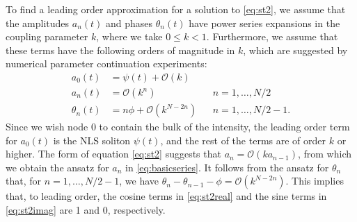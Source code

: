\documentclass[11pt,reqno]{amsart}
\begin{document}
To find a leading order approximation for a solution to \cref{eq:st2}, we assume that the amplitudes $a_n(t)$ and phases $\theta_n(t)$ have power series expansions in the coupling parameter $k$, where we take $0 \leq k < 1$. Furthermore, we assume that these terms have the following orders of magnitude in $k$, which are suggested by numerical parameter continuation experiments:
\begin{equation}\label{eq:basicseries}
\begin{aligned}
a_0(t) &= \psi(t) + \mathcal{O}\left(k\right) \\
a_n(t) &= \mathcal{O}\left(k^n\right) && n = 1, \dots, N/2 \\
\theta_n(t) &= n \phi + \mathcal{O}\left(k^{N - 2n}\right) && n = 1, \dots, N/2-1.
\end{aligned}
\end{equation}
Since we wish node 0 to contain the bulk of the intensity, the leading order term for $a_0(t)$ is the NLS soliton $\psi(t)$, and the rest of the terms are of order $k$ or higher. The form of equation \cref{eq:st2} suggests that $a_n = \mathcal{O}(k a_{n-1})$, from which we obtain the ansatz for $a_n$ in \cref{eq:basicseries}. It follows from the ansatz for $\theta_n$ that, for $n = 1, \dots, N/2-1$, we have $\theta_n - \theta_{n-1} - \phi = \mathcal{O}\left(k^{N - 2n}\right)$. This implies that, to leading order, the cosine terms in \cref{eq:st2real} and the sine terms in \cref{eq:st2imag} are 1 and 0, respectively.
\end{document}
